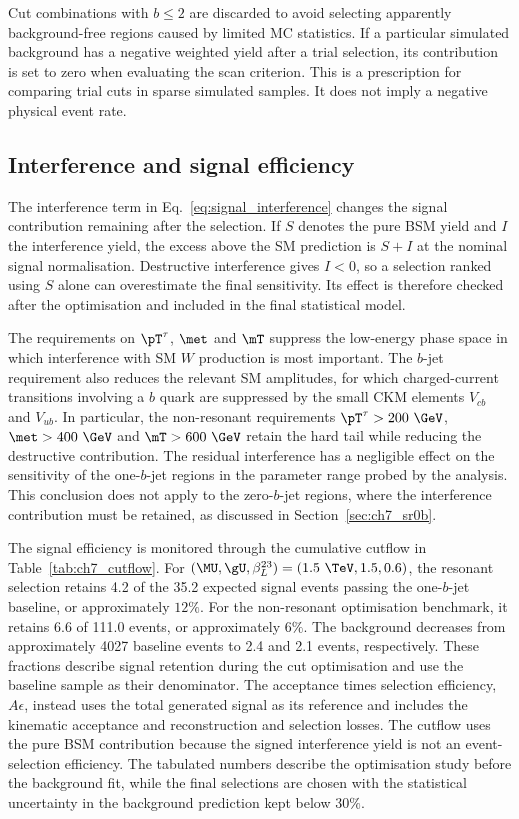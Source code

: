 Cut combinations with $b\leq2$ are discarded to avoid selecting apparently background-free regions caused by limited MC statistics.
If a particular simulated background has a negative weighted yield after a trial selection, its contribution is set to zero when evaluating the scan criterion.
This is a prescription for comparing trial cuts in sparse simulated samples.
It does not imply a negative physical event rate.

\subsection{Interference and signal efficiency}
\label{subsec:ch7_efficiency}

The interference term in Eq.~\ref{eq:signal_interference} changes the signal contribution remaining after the selection.
If $S$ denotes the pure BSM yield and $I$ the interference yield, the excess above the SM prediction is $S+I$ at the nominal signal normalisation.
Destructive interference gives $I<0$, so a selection ranked using $S$ alone can overestimate the final sensitivity.
Its effect is therefore checked after the optimisation and included in the final statistical model.

The requirements on $\pT^\tau$, $\met$ and $\mT$ suppress the low-energy phase space in which interference with SM $W$ production is most important.
The $b$-jet requirement also reduces the relevant SM amplitudes, for which charged-current transitions involving a $b$ quark are suppressed by the small CKM elements $V_{cb}$ and $V_{ub}$.
In particular, the non-resonant requirements $\pT^\tau>200~\GeV$, $\met>400~\GeV$ and $\mT>600~\GeV$ retain the hard tail while reducing the destructive contribution.
The residual interference has a negligible effect on the sensitivity of the one-$b$-jet regions in the parameter range probed by the analysis.
This conclusion does not apply to the zero-$b$-jet regions, where the interference contribution must be retained, as discussed in Section~\ref{sec:ch7_sr0b}.

The signal efficiency is monitored through the cumulative cutflow in Table~\ref{tab:ch7_cutflow}.
For $(\MU,\gU,\beta_L^{23})=(1.5~\TeV,1.5,0.6)$, the resonant selection retains 4.2 of the 35.2 expected signal events passing the one-$b$-jet baseline, or approximately $12\%$.
For the non-resonant optimisation benchmark, it retains 6.6 of 111.0 events, or approximately $6\%$.
The background decreases from approximately 4027 baseline events to 2.4 and 2.1 events, respectively.
These fractions describe signal retention during the cut optimisation and use the baseline sample as their denominator.
The acceptance times selection efficiency, $A\epsilon$, instead uses the total generated signal as its reference and includes the kinematic acceptance and reconstruction and selection losses.
The cutflow uses the pure BSM contribution because the signed interference yield is not an event-selection efficiency.
The tabulated numbers describe the optimisation study before the background fit, while the final selections are chosen with the statistical uncertainty in the background prediction kept below $30\%$.

